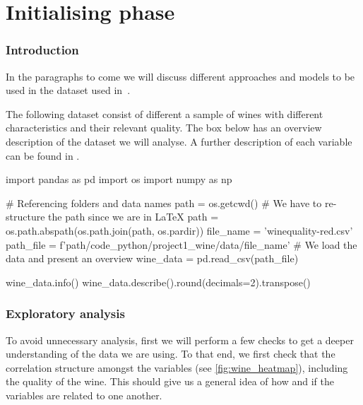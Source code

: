 \documentclass[11pt]{article}
\begin{document}


\tableofcontents\newpage

\part{Initialising phase} \label{part:initialising}

\section{Introduction}\label{sec:introduction}
In the paragraphs to come we will discuss different approaches and models to be used in the dataset used in~\cite{wine}.

The following dataset consist of different a sample of wines with different characteristics and their relevant
quality.
The box below has an overview description of the dataset we will analyse.
A further description of each variable can be found in .

\begin{pyconcode}
import pandas as pd
import os
import numpy as np

# Referencing folders and data names
path = os.getcwd()
# We have to re-structure the path since we are in LaTeX
path = os.path.abspath(os.path.join(path, os.pardir))
file_name = 'winequality-red.csv'
path_file = f'{path}/code_python/project1_wine/data/{file_name}'
# We load the data and present an overview
wine_data = pd.read_csv(path_file)
\end{pyconcode}

\begin{pyconsole}[][]
wine_data.info()
wine_data.describe().round(decimals=2).transpose()
\end{pyconsole}

\section{Exploratory analysis}\label{sec:exploratory-analysis}

To avoid unnecessary analysis, first we will perform a few checks to get a deeper understanding of the
data we are using.
To that end, we first check that the correlation structure amongst the variables (see \cref{fig:wine_heatmap}),
including the quality of the wine.
This should give us a general idea of how and if the variables are related to one another.
\end{document}
